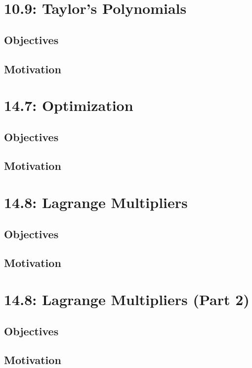 \documentclass{report}
\begin{document}
\begin{sloppypar}
\chapter{10.9: Taylor's Polynomials}
\section{Objectives}
\section{Motivation}
\chapter{14.7: Optimization}
\section{Objectives}
\section{Motivation}
\chapter{14.8: Lagrange Multipliers}
\section{Objectives}
\section{Motivation}
\chapter{14.8: Lagrange Multipliers (Part 2)}
\section{Objectives}
\section{Motivation}
\end{sloppypar}
\end{document}
